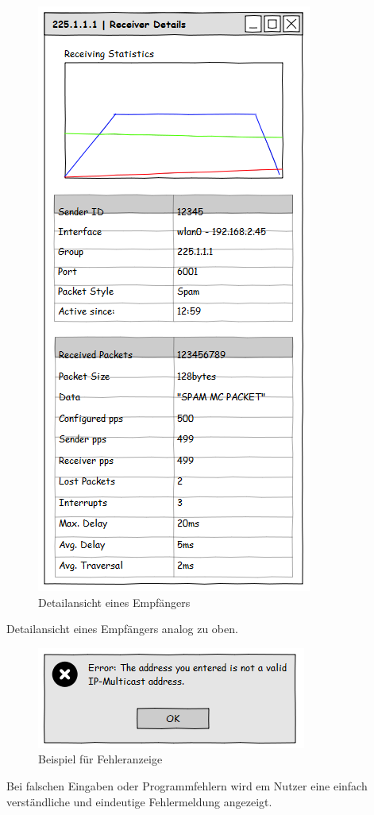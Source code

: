 \begin{figure}[H]
\centering
\includegraphics[scale=0.5]{images/gui/detailsrec.png}
\caption{Detailansicht eines Empfängers}
\end{figure}
Detailansicht eines Empfängers analog zu oben.

\begin{figure}[H]
\centering
\includegraphics[scale=0.5]{images/gui/error.png}
\caption{Beispiel für Fehleranzeige}
\end{figure}
Bei falschen Eingaben oder Programmfehlern wird em Nutzer eine einfach
verständliche und eindeutige Fehlermeldung angezeigt.

